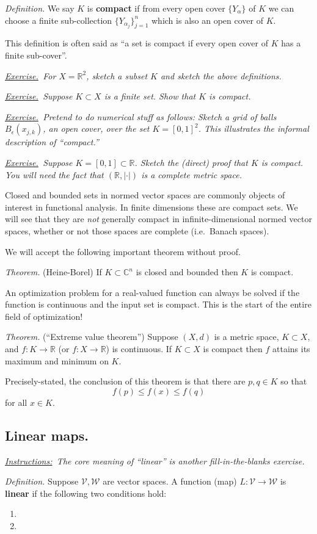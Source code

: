 \documentclass[12pt]{article}
\newcommand{\cV}{\mathcal{V}}
\newcommand{\cW}{\mathcal{W}}
\newcommand{\CC}{\mathbb{C}}
\newcommand{\RR}{\mathbb{R}}
\newcommand{\eps}{\epsilon}
\newcommand{\sect}[1]{\subsection*{#1.}}
\newcommand{\defin}{\emph{Definition.}\,\,}
\newcommand{\thm}{\emph{Theorem.}\,\,}
\newcommand{\exer}[2]{\emph{\underline{Exercise.}\, #2} \vspace*{#1mm}}
\newcommand{\instruct}[2]{\emph{\underline{Instructions:}\, #2} \vspace*{#1mm}}
\begin{document}
\defin We say $K$ is \textbf{compact} if from every open cover $\{Y_\alpha\}$ of $K$ we can choose a finite sub-collection $\{Y_{\alpha_j}\}_{j=1}^n$ which is also an open cover of $K$.

This definition is often said as ``a set is compact if every open cover of $K$ has a finite sub-cover''.

\exer{50}{For $X=\RR^2$, sketch a subset $K$ and sketch the above definitions.}

\exer{40}{Suppose $K\subset X$ is a finite set.  Show that $K$ is compact.}

\exer{35}{Pretend to do numerical stuff as follows: Sketch a grid of balls $B_\eps(x_{j,k})$, an open cover, over the set $K=[0,1]^2$.  This illustrates the informal description of ``compact.''}

\clearpage\newpage
\exer{50}{Suppose $K=[0,1] \subset \RR$.  Sketch the (direct) proof that $K$ is compact.  You will need the fact that $(\RR,|\cdot|)$ is a complete metric space.}

Closed and bounded sets in normed vector spaces are commonly objects of interest in functional analysis.  In finite dimensions these are compact sets.  We will see that they are \emph{not} generally compact in infinite-dimensional normed vector spaces, whether or not those spaces are complete (i.e.~Banach spaces).

We will accept the following important theorem without proof.

\thm (Heine-Borel) If $K \subset \CC^n$ is closed and bounded then $K$ is compact.

An optimization problem for a real-valued function can always be solved if the function is continuous and the input set is compact.  This is the start of the entire field of optimization!

\thm (``Extreme value theorem'') Suppose $(X,d)$ is a metric space, $K\subset X$, and $f:K\to\RR$ (or $f:X\to\RR$) is continuous.  If $K \subset X$ is compact then $f$ attains its maximum and minimum on $K$.

Precisely-stated, the conclusion of this theorem is that there are $p,q\in K$ so that
    $$f(p) \le f(x) \le f(q)$$
for all $x \in K$.



\sect{Linear maps}

\instruct{0}{The core meaning of ``linear'' is another fill-in-the-blanks exercise.}

\defin Suppose $\cV,\cW$ are vector spaces.  A function (map) $L:\cV \to \cW$ is \textbf{linear} if the following two conditions hold:
\begin{enumerate}
\item \phantom{foo}
\item \phantom{foo}
\end{enumerate}
\end{document}
